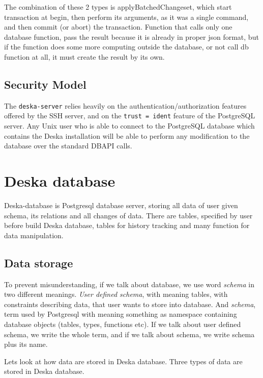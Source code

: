 \documentclass[deska]{subfiles}
\begin{document}
The combination of these 2 types is applyBatchedChangeset, which start transaction at begin, then perform its arguments, as it was a single
command, and then commit (or abort) the transaction. 
Function that calls only one database function, pass the result because it is already in proper json format, but if the function does some
more computing outside the database, or not call db function at all, it must create the result by its own.

\subsection{Security Model}
\label{sec:server-security-model}

The {\tt deska-server} relies heavily on the authentication/authorization features offered by the SSH server, and on the
{\tt trust = ident} feature of the PostgreSQL server.  Any Unix user who is able to connect to the PostgreSQL database
which contains the Deska installation will be able to perform any modification to the database over the standard DBAPI
calls.


\section{Deska database}
Deska-database is Postgresql database server, storing all data of user given schema, its relations and all changes of data.
There are tables, specified by user before build Deska database, tables for history tracking and many function for data manipulation.

\subsection{Data storage}
To prevent misunderstanding, if we talk about database, we use word {\em schema} in two different meanings. {\em User defined schema},
with meaning tables, with constraints describing data, that user wants to store into database. And {\em schema}, term used by
Postgresql with meaning something as namespace containing database objects (tables, types, functions etc).
If we talk about user defined schema, we write the whole term, and if we talk about schema, we write
schema plus its name.

Lets look at how data are stored in Deska database. Three types of data are stored in Deska database.
\end{document}
